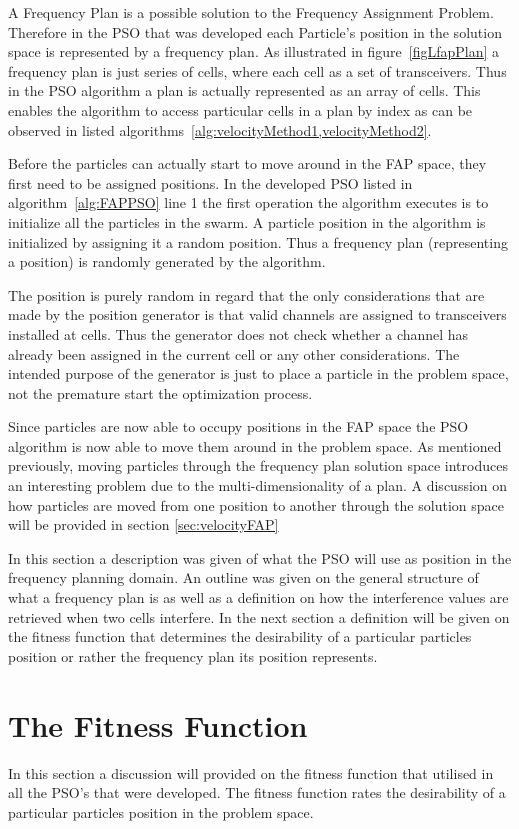 A Frequency Plan is a possible solution to the Frequency Assignment Problem. Therefore in the PSO that was developed each Particle's position in the solution space is represented by a frequency plan. As illustrated in figure~\ref{figLfapPlan} a frequency plan is just series of cells, where each cell as a set of transceivers. Thus in the PSO algorithm a plan is actually represented as an array of cells. This enables the algorithm to access particular cells in a plan by index as can be observed in listed algorithms~\ref{alg:velocityMethod1,velocityMethod2}. 

Before the particles can actually start to move around in the FAP space, they first need to be assigned positions. In the developed PSO listed in algorithm~\ref{alg:FAPPSO} line 1 the first operation the algorithm executes is to initialize all the particles in the swarm. A particle position in the algorithm is initialized by assigning it a random position. Thus a frequency plan (representing a position) is randomly generated by the algorithm.

The position is purely random in regard that the only considerations that are made by the position generator is that valid channels are assigned to transceivers installed at cells. Thus the generator does not check whether a channel has already been assigned in the current cell or any other considerations. The intended purpose of the generator is just to place a particle in the problem space, not the premature start the optimization process.

Since particles are now able to occupy positions in the FAP space the PSO algorithm is now able to move them around in the problem space. As mentioned previously, moving particles through the frequency plan solution space introduces an interesting problem due to the multi-dimensionality of a plan. A discussion on how particles are moved from one position to another through the solution space will be provided in section \ref{sec:velocityFAP}

In this section a description was given of what the PSO will use as position in the frequency planning domain. An outline was given on the general structure of what a frequency plan is as well as a definition on how the interference values are retrieved when two cells interfere. In the next section a definition will be given on the fitness function that determines the desirability of a particular particles position or rather the frequency plan its position represents.
\section{The Fitness Function}
In this section a discussion will provided on the fitness function that utilised in all the PSO's that were developed. The fitness function rates the desirability of a particular particles position in the problem space.

